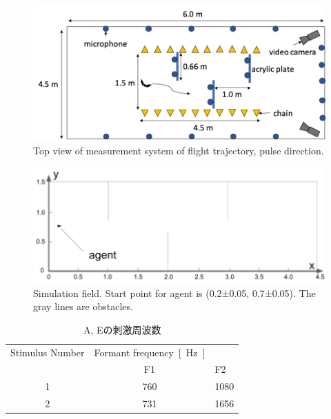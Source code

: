\documentclass[upLatex]{jsreport}
\begin{document}
\makeatletter
{}
\makeatother

\def\thefigure{\arabic{figure}}
\def\thetable{\arabic{table}}


\begin{figure}[H]
  \centering
  \includegraphics[width=15cm]{figures/top_view_measure.png}
  \caption{
    Top view of measurement system of flight trajectory,
    pulse direction.
  }
  \label{fig:top_view_measure}
\end{figure}

\newpage
{}
\begin{figure}[H]
  \centering
  \vfill
  \includegraphics[width=15cm]{figures/simulation_field.png}
  \caption{
    Simulation field.
    Start point for agent is (0.2±0.05, 0.7±0.05).
    The gray lines are obstacles.
  }\label{fig:simulation_field}
\end{figure}

\newpage
{}
\begin{table}[H]
  \caption{A, Eの刺激周波数}\label{tab:ae}
  \centering
    \begin{tabular}{c|cl}
      Stimulus Number & Formant frequency\SI{}{[\hertz]} \\
          & F1 & F2 \\ \hline
      1 & 760 & 1080 \\
      2 & 731 & 1656\\
    \end{tabular}
\end{table}
\end{document}
